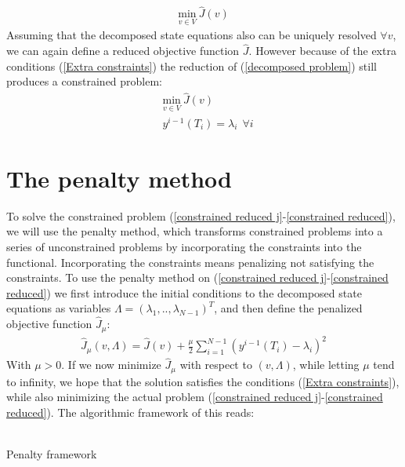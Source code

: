 \begin{align*}
\underset{v\in V}{\text{min}} \ \hat J(v)
\end{align*} 
Assuming that the decomposed state equations also can be uniquely resolved $\forall v$, we can again define a reduced objective function  $\hat{J}$. However because of the extra conditions (\ref{Extra constraints}) the reduction of (\ref{decomposed problem}) still produces a constrained problem:
\begin{align}
&\underset{v\in V}{\text{min}} \ \hat J(v) \label{constrained reduced j}\\
&y^{i-1}(T_i)=\lambda_i \ \ \forall i \label{constrained reduced}
\end{align} 
\section{The penalty method} \label{penalty_sec}
To solve the constrained problem (\ref{constrained reduced j}-\ref{constrained reduced}), we will use the penalty method, which transforms constrained problems into a series of unconstrained problems by incorporating the constraints into the functional. Incorporating the constraints means penalizing not satisfying the constraints. To use the penalty method on (\ref{constrained reduced j}-\ref{constrained reduced}) we first introduce the initial conditions to the decomposed state equations as variables $\Lambda = (\lambda_1,..,\lambda_{N-1})^T$, and then define the penalized objective function $\hat J_{\mu}$:
\begin{align}
\hat J_{\mu}(v,\Lambda) = \hat J(v) + \frac{\mu}{2}\sum_{i=1}^{N-1}(y^{i-1}(T_i)-\lambda_i)^2 \label{pen_obj_J}
\end{align}
With $\mu>0$. If we now minimize $\hat{J}_{\mu}$ with respect to $(v,\Lambda)$, while letting $\mu$ tend to infinity, we hope that the solution satisfies the conditions (\ref{Extra constraints}), while also minimizing the actual problem (\ref{constrained reduced j}-\ref{constrained reduced}). The algorithmic framework of this reads:
\\
\\
\begin{algorithm}[H]
\caption{Penalty framework\label{PEN_ALG}}
\end{algorithm}
